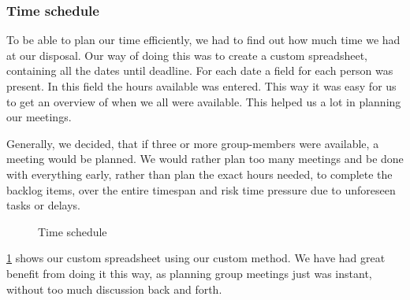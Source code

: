 \subsubsection{Time schedule}
To be able to plan our time efficiently, we had to find out how much time we had at our disposal. Our way of doing this was to create a custom spreadsheet, containing all the dates until deadline. For each date a field for each person was present. In this field the hours available was entered. This way it was easy for us to get an overview of when we all were available. This helped us a lot in planning our meetings.

Generally, we decided, that if three or more group-members were available, a meeting would be planned. We would rather plan too many meetings and be done with everything early, rather than plan the exact hours needed, to complete the backlog items, over the entire timespan and risk time pressure due to unforeseen tasks or delays.

\begin{figure}[H]
  \caption{Time schedule}
  \label{time schedule}
\end{figure}

\cref{time schedule} shows our custom spreadsheet using our custom method. We have had great benefit from doing it this way, as planning group meetings just was instant, without too much discussion back and forth.